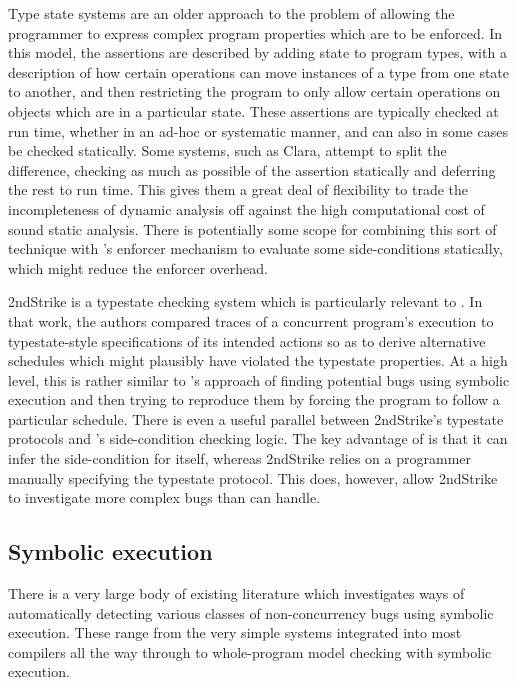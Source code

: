 Type state systems\cite{Strom1986a} are an older approach to the
problem of allowing the programmer to express complex program
properties which are to be enforced.  In this model, the assertions
are described by adding state to program types, with a description of
how certain operations can move instances of a type from one state to
another, and then restricting the program to only allow certain
operations on objects which are in a particular state.  These
assertions are typically checked at run time\cite{Wolff2011}, whether
in an ad-hoc\cite[pages~305--314]{Gamma1995} or
systematic\cite{Aldrich2009} manner, and can also in some cases be
checked statically\cite{Lam2005}.  Some systems, such as
Clara\cite{Bodden2010}, attempt to split the difference, checking as much as
possible of the assertion statically and deferring the rest to run
time.  This gives them a great deal of flexibility to trade the
incompleteness of dynamic analysis off against the high computational
cost of sound static analysis.  There is potentially some scope for
combining this sort of technique with {\technique}'s enforcer
mechanism to evaluate some side-conditions statically, which might
reduce the enforcer overhead.

2ndStrike\cite{Gao2011} is a typestate checking system which is
particularly relevant to {\technique}.  In that work, the authors
compared traces of a concurrent program's execution to typestate-style
specifications of its intended actions so as to derive alternative
schedules which might plausibly have violated the typestate
properties.  At a high level, this is rather similar to {\technique}'s
approach of finding potential bugs using symbolic execution and then
trying to reproduce them by forcing the program to follow a particular
schedule.  There is even a useful parallel between 2ndStrike's
typestate protocols and {\technique}'s side-condition checking logic.
The key advantage of {\technique} is that it can infer the
side-condition for itself, whereas 2ndStrike relies on a programmer
manually specifying the typestate protocol.  This does, however, allow
2ndStrike to investigate more complex bugs than {\technique} can
handle.

\subsection{Symbolic execution}

There is a very large body of existing literature which investigates
ways of automatically detecting various classes of non-concurrency
bugs using symbolic execution.  These range from the very simple
systems integrated into most compilers\needCite{} all the way through
to whole-program model checking with symbolic
execution\cite{Ball2011}.  

